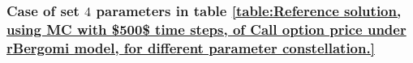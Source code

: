 \subsubsection{Case of set $4$ parameters in table \ref{table:Reference solution, using MC with $500$ time steps, of Call option price under rBergomi model, for different parameter constellation.}}\label{sec:Case of set 5 parameters}
%		
%		

